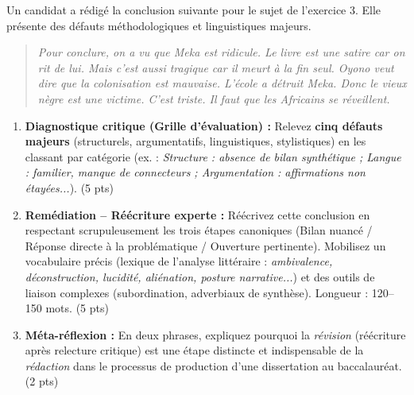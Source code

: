 \documentclass[11pt]{article}
\begin{document}
\begin{exercice}
Un candidat a rédigé la conclusion suivante pour le sujet de l'exercice 3. Elle présente des défauts méthodologiques et linguistiques majeurs.

\begin{quote}
\textit{Pour conclure, on a vu que Meka est ridicule. Le livre est une satire car on rit de lui. Mais c'est aussi tragique car il meurt à la fin seul. Oyono veut dire que la colonisation est mauvaise. L'école a détruit Meka. Donc le vieux nègre est une victime. C'est triste. Il faut que les Africains se réveillent.}
\end{quote}

\begin{enumerate}
    \item \textbf{Diagnostique critique (Grille d'évaluation) :} Relevez \textbf{cinq défauts majeurs} (structurels, argumentatifs, linguistiques, stylistiques) en les classant par catégorie (ex. : \textit{Structure : absence de bilan synthétique ; Langue : familier, manque de connecteurs ; Argumentation : affirmations non étayées...}). (5 pts)
    \item \textbf{Remédiation -- Réécriture experte :} Réécrivez cette conclusion en respectant scrupuleusement les trois étapes canoniques (Bilan nuancé / Réponse directe à la problématique / Ouverture pertinente). Mobilisez un vocabulaire précis (lexique de l'analyse littéraire : \textit{ambivalence, déconstruction, lucidité, aliénation, posture narrative...}) et des outils de liaison complexes (subordination, adverbiaux de synthèse). Longueur : 120--150 mots. (5 pts)
    \item \textbf{Méta-réflexion :} En deux phrases, expliquez pourquoi la \textit{révision} (réécriture après relecture critique) est une étape distincte et indispensable de la \textit{rédaction} dans le processus de production d'une dissertation au baccalauréat. (2 pts)
\end{enumerate}
\end{exercice}
\end{document}
